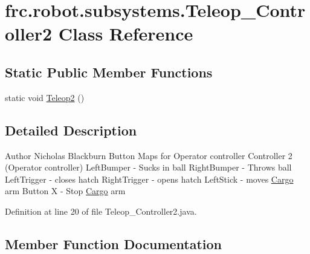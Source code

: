 \hypertarget{classfrc_1_1robot_1_1subsystems_1_1_teleop___controller2}{}\section{frc.\+robot.\+subsystems.\+Teleop\+\_\+\+Controller2 Class Reference}
\label{classfrc_1_1robot_1_1subsystems_1_1_teleop___controller2}
\subsection*{Static Public Member Functions}
\begin{DoxyCompactItemize}
\item 
static void \hyperlink{classfrc_1_1robot_1_1subsystems_1_1_teleop___controller2_a2943912b4181f00e084af67a56f6837f}{Teleop2} ()
\end{DoxyCompactItemize}


\subsection{Detailed Description}
\begin{DoxyAuthor}{Author}
Nicholas Blackburn Button Maps for Operator controller Controller 2 (Operator controller) Left\+Bumper -\/ Sucks in ball Right\+Bumper -\/ Throws ball Left\+Trigger -\/ closes hatch Right\+Trigger -\/ opens hatch Left\+Stick -\/ moves \hyperlink{classfrc_1_1robot_1_1subsystems_1_1_cargo}{Cargo} arm Button X -\/ Stop \hyperlink{classfrc_1_1robot_1_1subsystems_1_1_cargo}{Cargo} arm 
\end{DoxyAuthor}


Definition at line 20 of file Teleop\+\_\+\+Controller2.\+java.



\subsection{Member Function Documentation}
\mbox{\label{classfrc_1_1robot_1_1subsystems_1_1_teleop___controller2_a2943912b4181f00e084af67a56f6837f}} 

